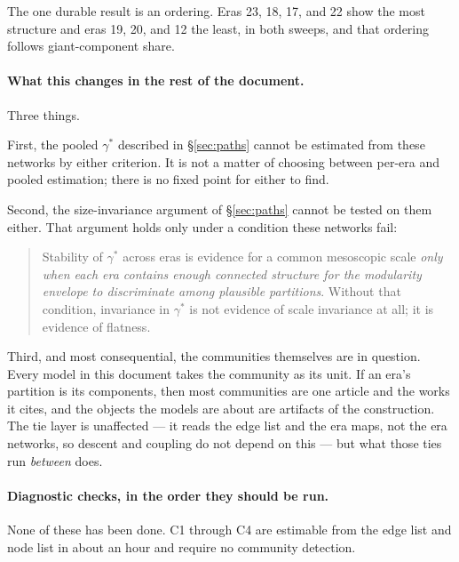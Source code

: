 \documentclass[11pt]{article}
\begin{document}
The one durable result is an ordering. Eras 23, 18, 17, and 22 show the most structure and
eras 19, 20, and 12 the least, in both sweeps, and that ordering follows giant-component
share.

\paragraph{What this changes in the rest of the document.} Three things.

First, the pooled $\gamma^{*}$ described in \S\ref{sec:paths} cannot be estimated from these
networks by either criterion. It is not a matter of choosing between per-era and pooled
estimation; there is no fixed point for either to find.

Second, the size-invariance argument of \S\ref{sec:paths} cannot be tested on them either.
That argument holds only under a condition these networks fail:

\begin{quote}
	Stability of $\gamma^{*}$ across eras is evidence for a common mesoscopic scale \emph{only
	when each era contains enough connected structure for the modularity envelope to
	discriminate among plausible partitions}. Without that condition, invariance in
	$\gamma^{*}$ is not evidence of scale invariance at all; it is evidence of flatness.
\end{quote}

Third, and most consequential, the communities themselves are in question. Every model in
this document takes the community as its unit. If an era's partition is its components, then
most communities are one article and the works it cites, and the objects the models are about
are artifacts of the construction. The tie layer is unaffected --- it reads the edge list and
the era maps, not the era networks, so descent and coupling do not depend on this --- but what
those ties run \emph{between} does.

\paragraph{Diagnostic checks, in the order they should be run.}
\label{sec:checks}
None of these has been done. C1 through C4 are estimable from the edge list and node list in
about an hour and require no community detection.
\end{document}
